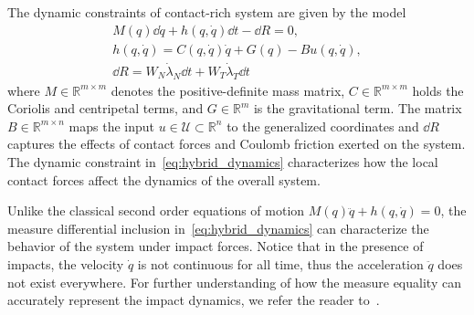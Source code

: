 {%
The dynamic constraints of contact-rich system are given by the
model~\cite{glocker2005formulation}
\begin{equation}
  \begin{gathered}
    M(q) \dd \dot{q} + h(q, \dot{q})\dd t - \dd R  = 0, \\
    h(q, \dot{q}) = C(q, \dot{q})\dot{q} + G(q) - Bu(q, \dot{q}), \\
    \dd R = W_N \dot{\lambda}_N \dd t + W_T \dot{\lambda}_T \dd t
  \end{gathered}
  \label{eq:hybrid_dynamics}
\end{equation}
%
\noindent where $M \in \mathbb{R}^{m \times m}$ denotes the positive-definite
mass matrix, $C \in \mathbb{R}^{m \times m}$ holds the Coriolis and centripetal
terms, and $G \in \mathbb{R}^{m}$ is the gravitational term. The matrix $B \in
\mathbb{R}^{m \times n}$ maps the input $u \in \mathcal{U} \subset
\mathbb{R}^{n}$ to the generalized coordinates and $\dd R$ captures the effects
of contact forces and Coulomb friction exerted on the system.  The dynamic
constraint in~\eqref{eq:hybrid_dynamics} characterizes how the local contact
forces affect the dynamics of the overall system.
\begin{rem}
  Unlike the classical second order equations of motion $M(q) \ddot{q} + h(q,
  \dot{q}) = 0$, the measure differential inclusion
  in~\eqref{eq:hybrid_dynamics} can characterize the behavior of the system
  under impact forces. Notice that in the presence of impacts, the velocity
  $\dot{q}$ is not continuous for all time, thus the acceleration $\ddot{q}$
  does not exist everywhere. For further understanding of how the measure
  equality can accurately represent the impact dynamics, we refer the reader
  to~\cite{moreau1988unilateral}.
\end{rem}

}

